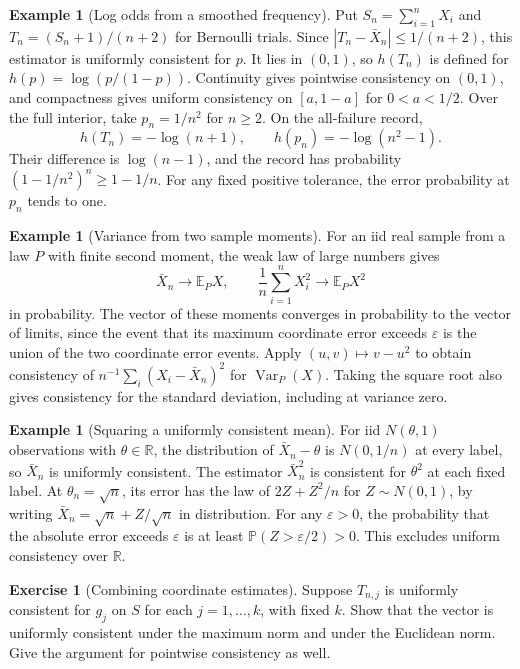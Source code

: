 \documentclass[11pt,oneside]{book}
\theoremstyle{definition}
\newtheorem{example}[theorem]{Example}
\newtheorem{exercise}{Exercise}[section]
\theoremstyle{remark}
\newcommand{\R}{\mathbb R}
\begin{document}
\begin{example}[Log odds from a smoothed frequency]
\label{ex:asymptotic-transform-bernoulli-log-odds}
Put $S_n=\sum_{i=1}^n X_i$ and $T_n=(S_n+1)/(n+2)$ for
Bernoulli trials. Since $|T_n-\bar X_n|\leq1/(n+2)$, this
estimator is uniformly consistent for $p$. It lies in $(0,1)$,
so $h(T_n)$ is defined for $h(p)=\log(p/(1-p))$.
Continuity gives pointwise consistency on $(0,1)$, and
compactness gives uniform consistency on $[a,1-a]$ for
$0<a<1/2$. Over the full interior, take $p_n=1/n^2$ for
$n\geq2$. On the all-failure record,
\[
h(T_n)=-\log(n+1),\qquad h(p_n)=-\log(n^2-1).
\]
Their difference is $\log(n-1)$, and the record has
probability $(1-1/n^2)^n\geq1-1/n$. For any fixed positive
tolerance, the error probability at $p_n$ tends to one.
\end{example}

\begin{example}[Variance from two sample moments]
\label{ex:asymptotic-transform-sample-variance}
For an iid real sample from a law $P$ with finite second
moment, the weak law of large numbers gives
\[
\bar X_n\longrightarrow\mathbb E_P X,\qquad
\frac1n\sum_{i=1}^n X_i^2\longrightarrow\mathbb E_P X^2
\]
in probability. The vector of these moments converges in
probability to the vector of limits, since the event that its
maximum coordinate error exceeds $\varepsilon$ is the union
of the two coordinate error events. Apply $(u,v)\mapsto v-u^2$
to obtain consistency of $n^{-1}\sum_i(X_i-\bar X_n)^2$
for $\operatorname{Var}_P(X)$. Taking the square root also
gives consistency for the standard deviation, including at
variance zero.
\end{example}

\begin{example}[Squaring a uniformly consistent mean]
\label{ex:asymptotic-transform-square-not-uniform}
For iid $N(\theta,1)$ observations with $\theta\in\R$, the
distribution of $\bar X_n-\theta$ is $N(0,1/n)$ at every
label, so $\bar X_n$ is uniformly consistent. The estimator
$\bar X_n^2$ is consistent for $\theta^2$ at each fixed label.
At $\theta_n=\sqrt n$, its error has the law of $2Z+Z^2/n$
for $Z\sim N(0,1)$, by writing $\bar X_n=\sqrt n+Z/\sqrt n$
in distribution. For any $\varepsilon>0$, the probability
that the absolute error exceeds $\varepsilon$ is at least
$\mathbb P(Z>\varepsilon/2)>0$. This excludes uniform
consistency over $\R$.
\end{example}

\begin{exercise}[Combining coordinate estimates]
\label{exer:asymptotic-transform-vector-assembly}
Suppose $T_{n,j}$ is uniformly consistent for $g_j$ on $S$
for each $j=1,\ldots,k$, with fixed $k$. Show that the vector
is uniformly consistent under the maximum norm and under
the Euclidean norm. Give the argument for pointwise consistency
as well.
\end{exercise}
\end{document}
